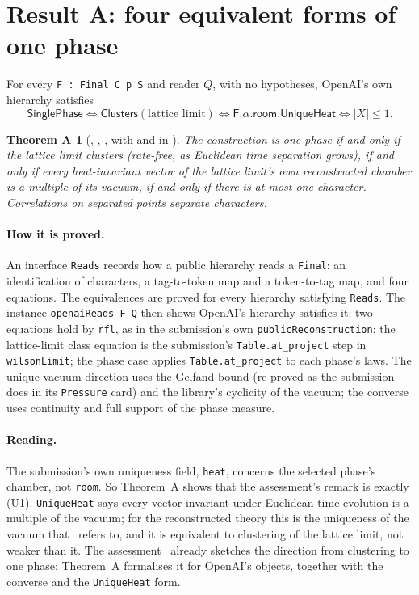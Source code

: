 \documentclass[11pt,a4paper]{article}
\newcommand{\lean}[1]{\texttt{#1}}
\theoremstyle{plain}
\newtheorem*{theoremA}{Theorem A}
\begin{document}
\section{Result A: four equivalent forms of one phase}\label{sec:A}

For every \lean{F : Final C p S} and reader $Q$, with no hypotheses, OpenAI's own hierarchy satisfies
\[
\textsf{SinglePhase} \iff \textsf{Clusters}(\text{lattice limit}) \iff \textsf{F.}\alpha\textsf{.room.UniqueHeat} \iff |X|\le 1 .
\]

\begin{theoremA}[, , , with  and  in ]
The construction is one phase if and only if the lattice limit clusters (rate-free, as Euclidean time separation grows), if and only if every heat-invariant vector of the lattice limit's own reconstructed chamber is a multiple of its vacuum, if and only if there is at most one character. Correlations on separated points separate characters.
\end{theoremA}

\paragraph{How it is proved.} An interface \lean{Reads} records how a public hierarchy reads a \lean{Final}: an identification of characters, a tag-to-token map and a token-to-tag map, and four equations. The equivalences are proved for every hierarchy satisfying \lean{Reads}. The instance \lean{openaiReads F Q} then shows OpenAI's hierarchy satisfies it: two equations hold by \lean{rfl}, as in the submission's own \lean{publicReconstruction}; the lattice-limit class equation is the submission's \lean{Table.at\_project} step in \lean{wilsonLimit}; the phase case applies \lean{Table.at\_project} to each phase's laws. The unique-vacuum direction uses the Gelfand bound (re-proved as the submission does in its \lean{Pressure} card) and the library's cyclicity of the vacuum; the converse uses continuity and full support of the phase measure.

\paragraph{Reading.} The submission's own uniqueness field, \lean{heat}, concerns the selected phase's chamber, not \lean{room}. So Theorem~A shows that the assessment's remark is exactly (U1). \lean{UniqueHeat} says every vector invariant under Euclidean time evolution is a multiple of the vacuum; for the reconstructed theory this is the uniqueness of the vacuum that~\cite[\S6.2]{YMgroup} refers to, and it is equivalent to clustering of the lattice limit, not weaker than it. The assessment~\cite[\S6.2]{YMgroup} already sketches the direction from clustering to one phase; Theorem~A formalises it for OpenAI's objects, together with the converse and the \lean{UniqueHeat} form.
\end{document}
